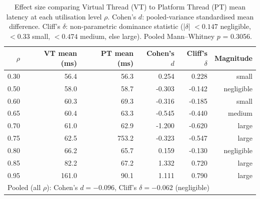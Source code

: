 \begin{table}[ht]
\centering
\caption{Effect size comparing Virtual Thread (VT) to Platform Thread (PT) mean latency at each utilisation level $\rho$. Cohen's $d$: pooled-variance standardised mean difference. Cliff's $\delta$: non-parametric dominance statistic (|$\delta$| $<0.147$ negligible, $<0.33$ small, $<0.474$ medium, else large). Pooled Mann--Whitney $p$ = 0.3056.}
\label{tab:effect_size}
\begin{tabular}{rrrrrr}
\toprule
$\rho$ & VT mean (ms) & PT mean (ms) & Cohen's $d$ & Cliff's $\delta$ & Magnitude \\
\midrule
  0.30 & 56.4 & 56.3 & 0.254 & 0.228 & small \\
  0.50 & 58.0 & 58.7 & -0.303 & -0.142 & negligible \\
  0.60 & 60.3 & 69.3 & -0.316 & -0.185 & small \\
  0.65 & 60.4 & 63.3 & -0.545 & -0.440 & medium \\
  0.70 & 61.0 & 62.9 & -1.200 & -0.620 & large \\
  0.75 & 62.5 & 753.2 & -0.323 & -0.547 & large \\
  0.80 & 66.2 & 65.7 & 0.159 & -0.130 & negligible \\
  0.85 & 82.2 & 67.2 & 1.332 & 0.720 & large \\
  0.95 & 161.0 & 90.1 & 1.111 & 0.790 & large \\
\midrule
\multicolumn{6}{l}{\footnotesize Pooled (all $\rho$): Cohen's $d = -0.096$, Cliff's $\delta = -0.062$ (negligible)} \\
\bottomrule
\end{tabular}
\end{table}